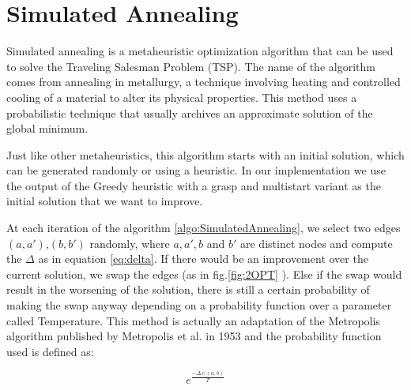 


\section{Simulated Annealing}

Simulated annealing is a metaheuristic optimization algorithm that can be used to solve the Traveling Salesman Problem (TSP).
The name of the algorithm comes from annealing in metallurgy, a technique involving heating and controlled cooling of a material to alter its physical properties. This method uses a probabilistic technique that usually archives an approximate solution of the global minimum.

Just like other metaheuristics, this algorithm starts with an initial solution, which can be generated randomly or using a heuristic. In our implementation we use the output of the Greedy heuristic with a grasp and multistart variant as the initial solution that we want to improve.

At each iteration of the algorithm \ref{algo:SimulatedAnnealing}, we select two edges $(a,a')$,$(b,b')$ randomly, where $a,a',b$ and $b'$ are distinct nodes and compute the $\Delta$ as in equation \ref{eq:delta}. If there would be an improvement over the current solution, we swap the edges (as in fig.\ref{fig:2OPT} ). Else if the swap would result in the worsening of the solution, there is still a certain probability of making the swap anyway depending on a probability function over a parameter called Temperature. This method is actually an adaptation of the Metropolis algorithm published by Metropolis et al. in 1953 and the probability function used is defined as:



\begin{equation*}
    e^{\frac{-\Delta \operatorname{c}(a,b)}{T}}
\end{equation*}

